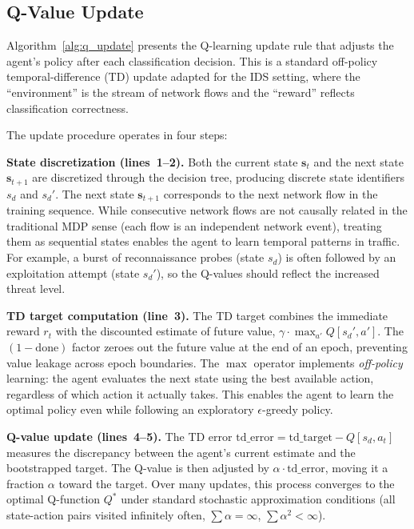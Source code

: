 \documentclass[12pt, letterpaper, oneside]{report}
\newcommand{\bs}{\mathbf{s}}
\begin{document}
\subsection{Q-Value Update}

Algorithm~\ref{alg:q_update} presents the Q-learning update rule that adjusts the agent's policy after each classification decision. This is a standard off-policy temporal-difference (TD) update adapted for the IDS setting, where the ``environment'' is the stream of network flows and the ``reward'' reflects classification correctness.

The update procedure operates in four steps:

\textbf{State discretization (lines~1--2).} Both the current state $\bs_t$ and the next state $\bs_{t+1}$ are discretized through the decision tree, producing discrete state identifiers $s_d$ and $s_d'$. The next state $\bs_{t+1}$ corresponds to the next network flow in the training sequence. While consecutive network flows are not causally related in the traditional MDP sense (each flow is an independent network event), treating them as sequential states enables the agent to learn temporal patterns in traffic. For example, a burst of reconnaissance probes (state $s_d$) is often followed by an exploitation attempt (state $s_d'$), so the Q-values should reflect the increased threat level.

\textbf{TD target computation (line~3).} The TD target combines the immediate reward $r_t$ with the discounted estimate of future value, $\gamma \cdot \max_{a'} Q[s_d', a']$. The $(1 - \text{done})$ factor zeroes out the future value at the end of an epoch, preventing value leakage across epoch boundaries. The $\max$ operator implements \emph{off-policy} learning: the agent evaluates the next state using the best available action, regardless of which action it actually takes. This enables the agent to learn the optimal policy even while following an exploratory $\epsilon$-greedy policy.

\textbf{Q-value update (lines~4--5).} The TD error $\text{td\_error} = \text{td\_target} - Q[s_d, a_t]$ measures the discrepancy between the agent's current estimate and the bootstrapped target. The Q-value is then adjusted by $\alpha \cdot \text{td\_error}$, moving it a fraction $\alpha$ toward the target. Over many updates, this process converges to the optimal Q-function $Q^*$ under standard stochastic approximation conditions (all state-action pairs visited infinitely often, $\sum \alpha = \infty$, $\sum \alpha^2 < \infty$).
\end{document}
